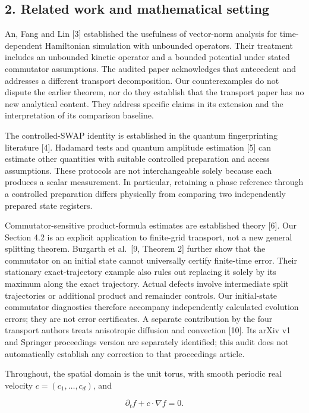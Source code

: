 \subsection{2. Related work and mathematical
setting}\label{related-work-and-mathematical-setting}

An, Fang and Lin {[}3{]} established the usefulness of vector-norm
analysis for time-dependent Hamiltonian simulation with unbounded
operators. Their treatment includes an unbounded kinetic operator and a
bounded potential under stated commutator assumptions. The audited paper
acknowledges that antecedent and addresses a different transport
decomposition. Our counterexamples do not dispute the earlier theorem,
nor do they establish that the transport paper has no new analytical
content. They address specific claims in its extension and the
interpretation of its comparison baseline.

The controlled-SWAP identity is established in the quantum
fingerprinting literature {[}4{]}. Hadamard tests and quantum amplitude
estimation {[}5{]} can estimate other quantities with suitable
controlled preparation and access assumptions. These protocols are not
interchangeable solely because each produces a scalar measurement. In
particular, retaining a phase reference through a controlled preparation
differs physically from comparing two independently prepared state
registers.

Commutator-sensitive product-formula estimates are established theory
{[}6{]}. Our Section 4.2 is an explicit application to finite-grid
transport, not a new general splitting theorem. Burgarth et al.~{[}9,
Theorem 2{]} further show that the commutator on an initial state cannot
universally certify finite-time error. Their stationary exact-trajectory
example also rules out replacing it solely by its maximum along the
exact trajectory. Actual defects involve intermediate split trajectories
or additional product and remainder controls. Our initial-state
commutator diagnostics therefore accompany independently calculated
evolution errors; they are not error certificates. A separate
contribution by the four transport authors treats anisotropic diffusion
and convection {[}10{]}. Its arXiv v1 and Springer proceedings version
are separately identified; this audit does not automatically establish
any correction to that proceedings article.

Throughout, the spatial domain is the unit torus, with smooth periodic
real velocity \(c=(c_1,\ldots,c_d)\), and

\[
\partial_t f+c\cdot\nabla f=0. \tag{1}
\]

